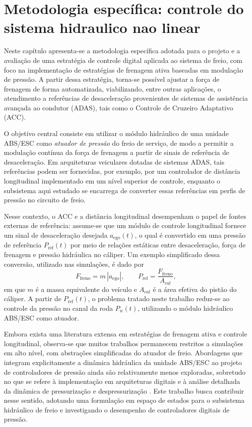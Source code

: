 \chapter{Metodologia específica: controle do sistema hidraulico nao linear}
\label{cap:controle}

Neste capítulo apresenta-se a metodologia específica adotada para o projeto e a avaliação de uma estratégia de controle digital aplicada ao sistema de freio, com foco na implementação de estratégias de frenagem ativa baseadas em modulação de pressão. A partir dessa estratégia, torna-se possível ajustar a força de frenagem de forma automatizada, viabilizando, entre outras aplicações, o atendimento a referências de desaceleração provenientes de sistemas de assistência avançada ao condutor (ADAS), tais como o Controle de Cruzeiro Adaptativo (ACC).

O objetivo central consiste em utilizar o módulo hidráulico de uma unidade ABS/ESC como \emph{atuador de pressão} do freio de serviço, de modo a permitir a modulação contínua da força de frenagem a partir de sinais de referência de desaceleração. Em arquiteturas veiculares dotadas de sistemas ADAS, tais referências podem ser fornecidas, por exemplo, por um controlador de distância longitudinal implementado em um nível superior de controle, enquanto o subsistema aqui estudado se encarrega de converter essas referências em perfis de pressão no circuito de freio.

Nesse contexto, o ACC e a distância longitudinal desempenham o papel de fontes externas de referência: assume-se que um módulo de controle longitudinal fornece um sinal de desaceleração desejada $a_{\mathrm{ego}}(t)$, o qual é convertido em uma pressão de referência $P_{\mathrm{ref}}(t)$ por meio de relações estáticas entre desaceleração, força de frenagem e pressão hidráulica no cáliper. Um exemplo simplificado dessa conversão, utilizado nas simulações, é dado por
\[
    F_{\mathrm{freno}} = m\,|a_{\mathrm{ego}}|, 
    \qquad
    P_{\mathrm{ref}} = \frac{F_{\mathrm{freno}}}{A_{cal}},
\]
em que $m$ é a massa equivalente do veículo e $A_{cal}$ é a área efetiva do pistão do cáliper. A partir de $P_{\mathrm{ref}}(t)$, o problema tratado neste trabalho reduz-se ao controle da pressão no canal da roda $P_w(t)$, utilizando o módulo hidráulico ABS/ESC como atuador.

Embora exista uma literatura extensa em estratégias de frenagem ativa e controle longitudinal, observa-se que muitos trabalhos permanecem restritos a simulações em alto nível, com abstrações simplificadas do atuador de freio. Abordagens que integram explicitamente a dinâmica hidráulica da unidade ABS/ESC ao projeto de controladores de pressão ainda são relativamente menos exploradas, sobretudo no que se refere à implementação em arquiteturas digitais e à análise detalhada da dinâmica de pressurização e despressurização \cite{HouhuaJing2022,PressureCoordinatedControl2023}. Este trabalho busca contribuir nesse sentido, adotando uma formulação em espaço de estados para o subsistema hidráulico de freio e investigando o desempenho de controladores digitais de pressão.

